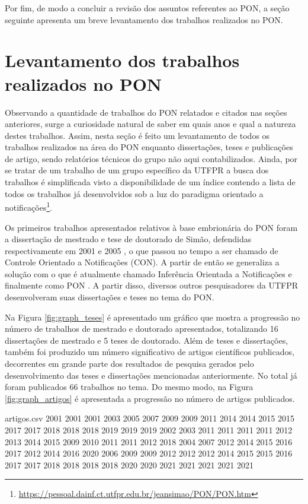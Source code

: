 Por fim, de modo a concluir a revisão dos assuntos referentes ao PON, a seção
seguinte apresenta um breve levantamento dos trabalhos realizados no PON.

\section{Levantamento dos trabalhos realizados no PON}\label{sec:review}

Observando a quantidade de trabalhos do PON relatados e citados nas seções
anteriores, surge a curiosidade natural de saber em quais anos e qual a natureza
destes trabalhos. Assim, nesta seção é feito um levantamento de todos os
trabalhos realizados na área do PON enquanto dissertações, teses e publicações
de artigo, sendo relatórios técnicos do grupo não aqui contabilizados. Ainda,
por se tratar de um trabalho de um grupo específico da UTFPR a busca dos
trabalhos é simplificada visto a disponibilidade de um índice contendo a lista
de todos os trabalhos já desenvolvidos sob a luz do paradigma orientado a
notificações\footnote{\url{https://pessoal.dainf.ct.utfpr.edu.br/jeansimao/PON/PON.htm}}.

Os primeiros trabalhos apresentados relativos à base embrionária do PON foram a
dissertação de mestrado e tese de doutorado de Simão, defendidas respectivamente
em 2001 e 2005 \cite{msc_simao_2001,doc_simao_2005}, o que passou no tempo a ser
chamado de Controle Orientado a Notificações (CON). A partir de então se
generaliza a solução com o que é atualmente chamado Inferência Orientada a
Notificações e finalmente como PON \cite{pat_simao_2008,simao_2009}. A partir
disso, diversos outros pesquisadores da UTFPR desenvolveram suas dissertações e
teses no tema do PON.

Na Figura \ref{fig:graph_teses} é apresentado um gráfico que mostra a progressão
no número de trabalhos de mestrado e doutorado apresentados, totalizando 16
dissertações de mestrado e 5 teses de doutorado. Além de teses e dissertações,
também foi produzido um número significativo de artigos científicos publicados,
decorrentes em grande parte dos resultados de pesquisa gerados pelo
desenvolvimento das teses e dissertações mencionadas anteriormente. No total já
foram publicados 66 trabalhos no tema. Do mesmo modo, na Figura
\ref{fig:graph_artigos} é apresentada a progressão no número de artigos
publicados.

\begin{filecontents}{artigos.csv}
  2001 2001 2001 2003 2005 2007 2009 2009 2011 2014 2014 2015 2015 2017 2017
  2018 2018 2018 2019 2019 2019 2002 2003 2011 2011 2011 2011 2012 2013 2014
  2015 2009 2010 2011 2011 2012 2018 2004 2007 2012 2014 2015 2016 2017 2012
  2014 2016 2020 2006 2009 2009 2012 2012 2012 2014 2015 2015 2016 2017 2017
  2018 2018 2018 2018 2020 2020 2021 2021 2021 2021 2021
\end{filecontents}

